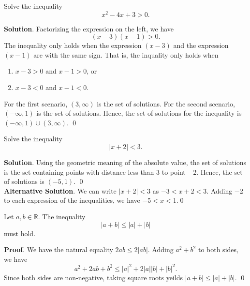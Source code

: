 \documentclass[11pt]{book}
\theoremstyle{break}
\theoremstyle{no_label}
\newcommand{\bbR}{\mathbb{R}}
\numberwithin{equation}{section}
\begin{document}
\begin{example}
    Solve the inequality $$x^2-4x+3>0.$$
\end{example}
\textbf{Solution}. Factorizing the expression on the left, we have $$(x-3)(x-1)>0.$$ The inequality only holds when the expression $(x-3)$ and the expression $(x-1)$ are with the same sign. That is, the inquality only holds when \begin{enumerate}
    \item $x-3>0$ and $x-1>0$, or
    \item $x-3<0$ and $x-1<0$.
\end{enumerate}
For the first scenario, $(3, \infty)$ is the set of solutions. For the second scenario, $(-\infty, 1)$ is the set of solutions. Hence, the set of solutions for the inequality is $(-\infty, 1)\cup(3, \infty)$. \qed

\begin{example}
    Solve the inequality $$|x+2|<3.$$
\end{example}
\textbf{Solution}. Using the geometric meaning of the absolute value, the set of solutions is the set containing points with distance less than $3$ to point $-2$. Hence, the set of solutions is $(-5, 1)$. \qed\\
\textbf{Alternative Solution}. We can write $|x+2|<3$ as $-3<x+2<3.$ Adding $-2$ to each expression of the inequalities, we have $-5<x<1.$\qed

\begin{theorem}
    Let $a, b\in\bbR$. The inequality $$|a+b|\leq |a|+|b|$$ must hold.
\end{theorem}
\textbf{Proof}. We have the natural equality $2ab\leq2|ab|$. Adding $a^2+b^2$ to both sides, we have $$a^2+2ab+b^2\leq |a|^2+2|a||b|+|b|^2.$$ Since both sides are non-negative, taking square roots yeilds $|a+b|\leq |a|+|b|.$ \qed
\end{document}
